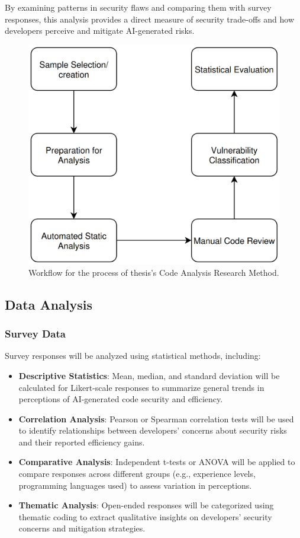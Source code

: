 By examining patterns in security flaws and comparing them with survey responses, this analysis provides a direct measure of security trade-offs and how developers perceive and mitigate AI-generated risks.


\begin{figure}[H]
    \centering
    \includegraphics[width=0.9\columnwidth]{assets/data-analysis.png}
    \caption{Workflow for the process of thesis's Code Analysis Research Method.}
    \label{fig:data_analysis_diagram}
\end{figure}

\subsection{Data Analysis}

\subsubsection{Survey Data}

Survey responses will be analyzed using statistical methods, including:

\begin{itemize}
    \item \textbf{Descriptive Statistics}: Mean, median, and standard deviation will be calculated for Likert-scale responses to summarize general trends in perceptions of AI-generated code security and efficiency.
    \item \textbf{Correlation Analysis}: Pearson or Spearman correlation tests will be used to identify relationships between developers’ concerns about security risks and their reported efficiency gains.
    \item \textbf{Comparative Analysis}: Independent t-tests or ANOVA will be applied to compare responses across different groups (e.g., experience levels, programming languages used) to assess variation in perceptions.
    \item \textbf{Thematic Analysis}: Open-ended responses will be categorized using thematic coding to extract qualitative insights on developers' security concerns and mitigation strategies.
\end{itemize}

